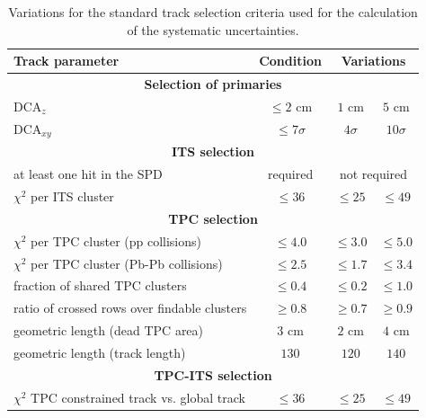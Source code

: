\documentclass[12pt,a4paper]{report}
\begin{document}
\begin{table}[tb!]
\renewcommand{\arraystretch}{1.5}
\centering
\begin{tabular}{l c c c}
\toprule
\rowcolor{headerBlue}  \textbf{Track parameter} &  \textbf{Condition}  &  \multicolumn{2}{c}{\textbf{Variations}} \\
\midrule
\multicolumn{4}{c}{\textbf{Selection of primaries}} \\
\midrule
$\text{DCA}_{z}$ & $\leq 2 $ cm & $1$ cm & $5$ cm\\
$\text{DCA}_{xy}$ & $\leq 7\sigma$ & $4\sigma$ & $10\sigma$ \\
\midrule
\multicolumn{4}{c}{\textbf{ITS selection}} \\
\midrule
at least one hit in the SPD & required  & \multicolumn{2}{c}{not required}\\
$\chi^2$ per ITS cluster  & $\leq 36$ & $\leq 25$ & $\leq 49$ \\
\midrule
\multicolumn{4}{c}{\textbf{TPC selection}} \\
\midrule
$\chi^2$ per TPC cluster (pp collisions) & $\leq 4.0$  & $\leq 3.0$ & $\leq 5.0$\\
$\chi^2$ per TPC cluster (Pb-Pb collisions) & $\leq 2.5$ & $\leq 1.7$ & $\leq 3.4$\\
fraction of shared  TPC clusters&  $\leq 0.4$  & $\leq 0.2$ & $\leq 1.0$ \\
ratio of crossed rows over findable clusters  & $\geq 0.8$ & $\geq 0.7$ & $\geq 0.9$\\
geometric length (dead TPC area) & $3$ cm & $2$ cm & $4$ cm \\
geometric length (track length) & $130$ & $120$  & $140$ \\

\midrule
\multicolumn{4}{c}{\textbf{TPC-ITS selection}} \\
\midrule
$\chi^2$ TPC constrained track vs. global track  & $\leq 36$ & $\leq 25$ & $\leq 49$ \\
\bottomrule
\end{tabular}
\caption{Variations for the standard track selection criteria used for the calculation of the systematic uncertainties.}
\label{tab:curVar}
\end{table}
\end{document}
